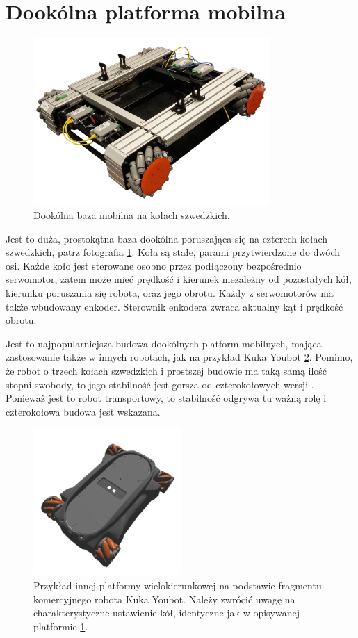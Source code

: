 \section{Dookólna platforma mobilna}
\begin{figure}[H]
\centering
 \includegraphics[width=0.8\textwidth]{graphics/base_photo.png}
\caption{Dookólna baza mobilna na kołach szwedzkich.}
\label{fig:base_photo}
\end{figure} 

Jest to duża, prostokątna baza dookólna poruszająca się na czterech kołach szwedzkich, patrz fotografia \ref{fig:base_photo}.
Koła są stałe, parami przytwierdzone do dwóch osi.
Każde koło jest sterowane osobno przez podłączony bezpośrednio serwomotor, zatem może mieć prędkość i kierunek niezależny od pozostałych kół, kierunku poruszania się robota, oraz jego obrotu.
Każdy z serwomotorów ma także wbudowany enkoder.
Sterownik enkodera zwraca aktualny kąt i prędkość obrotu.

Jest to najpopularniejsza budowa dookólnych platform mobilnych, mająca zastosowanie także w innych robotach, jak na przykład Kuka Youbot \ref{fig:kuka_youbot}.
Pomimo, że robot o trzech kołach szwedzkich i prostszej budowie ma taką samą ilość stopni swobody, to jego stabilność jest gorsza od czterokołowych wersji \cite{extra_axis}.
Ponieważ jest to robot transportowy, to stabilność odgrywa tu ważną rolę i czterokołowa budowa jest wskazana.

\begin{figure}[H]
\centering
 \includegraphics[width=0.5\textwidth]{graphics/kuka_youbot.png}
\caption{Przykład innej platformy wielokierunkowej na podstawie fragmentu komercyjnego robota Kuka Youbot. Należy zwrócić uwagę na charakterystyczne ustawienie kół, identyczne jak w opisywanej platformie \ref{fig:base_photo}.}
\label{fig:kuka_youbot}
\end{figure} 

